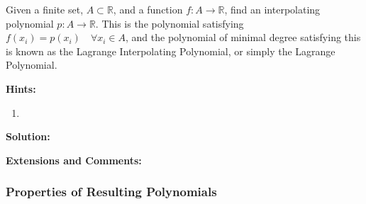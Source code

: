 Given a finite set, $A \subset \mathbb{R}$, and a function $f : A \to \mathbb{R}$, find an interpolating polynomial $p : A \to \mathbb{R}$. This is the polynomial satisfying $f(x_i) = p(x_i) \quad \forall x_i \in A$, and the polynomial of minimal degree satisfying this is known as the Lagrange Interpolating Polynomial, or simply the Lagrange Polynomial.

\textbf{Hints:}

\begin{enumerate}
    \item 
\end{enumerate}

\textbf{Solution:}



\textbf{Extensions and Comments:}


\subsubsection{Properties of Resulting Polynomials}

